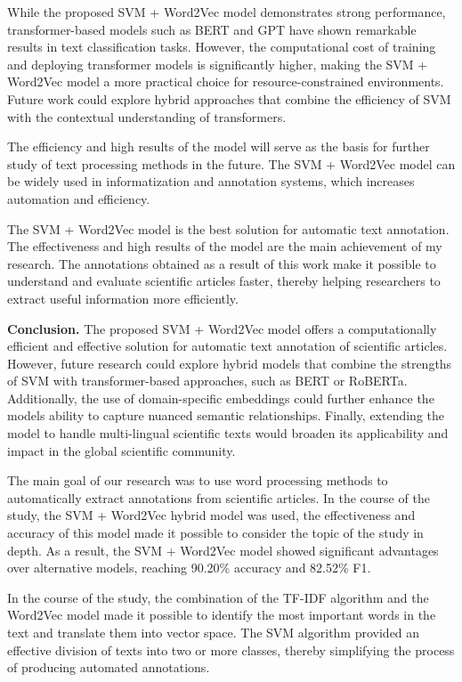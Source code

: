 \documentclass[
]{article}
\begin{document}
While the proposed SVM + Word2Vec model demonstrates strong performance,
transformer-based models such as BERT and GPT have shown remarkable
results in text classification tasks. However, the computational cost of
training and deploying transformer models is significantly higher,
making the SVM + Word2Vec model a more practical choice for
resource-constrained environments. Future work could explore hybrid
approaches that combine the efficiency of SVM with the contextual
understanding of transformers.

The efficiency and high results of the model will serve as the basis for
further study of text processing methods in the future. The SVM +
Word2Vec model can be widely used in informatization and annotation
systems, which increases automation and efficiency.

The SVM + Word2Vec model is the best solution for automatic text
annotation. The effectiveness and high results of the model are the main
achievement of my research. The annotations obtained as a result of this
work make it possible to understand and evaluate scientific articles
faster, thereby helping researchers to extract useful information more
efficiently.

\textbf{Conclusion.} The proposed SVM + Word2Vec model offers a
computationally efficient and effective solution for automatic text
annotation of scientific articles. However, future research could
explore hybrid models that combine the strengths of SVM with
transformer-based approaches, such as BERT or RoBERTa. Additionally, the
use of domain-specific embeddings could further enhance the
model\textquotesingle s ability to capture nuanced semantic
relationships. Finally, extending the model to handle multi-lingual
scientific texts would broaden its applicability and impact in the
global scientific community.

The main goal of our research was to use word processing methods to
automatically extract annotations from scientific articles. In the
course of the study, the SVM + Word2Vec hybrid model was used, the
effectiveness and accuracy of this model made it possible to consider
the topic of the study in depth. As a result, the SVM + Word2Vec model
showed significant advantages over alternative models, reaching 90.20\%
accuracy and 82.52\% F1.

In the course of the study, the combination of the TF-IDF algorithm and
the Word2Vec model made it possible to identify the most important words
in the text and translate them into vector space. The SVM algorithm
provided an effective division of texts into two or more classes,
thereby simplifying the process of producing automated annotations.
\end{document}
